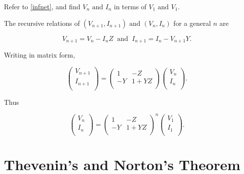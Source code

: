 \documentclass[english,a4paper,12pt]{report}
\begin{document}

{Refer to \cref{infnet}, and find \(V_{n} \text { and } I_{n}  \) in terms of \(V_1 \text { and } V_1 \).}
{The recursive relations of \((V_{n+1}, I_{n+1}) \text { and } (V_{n}, I_{n})\) for a general \(n\) are

\begin{equation}
    V_{n+1} = V_{n} - I_{n}Z ~\text { and }~ I_{n+1} = I_{n} - V_{n+1}Y.      
\end{equation}

Writing in matrix form,

\begin{equation}
    \begin{pmatrix}
         V_{n+1}  \\
         I_{n+1}  \\
    \end{pmatrix} = \begin{pmatrix}
        1 & -Z   \\
        -Y & 1+YZ  \\
    \end{pmatrix} \begin{pmatrix}
         V_{n}  \\
         I_{n}  \\
    \end{pmatrix}.
\end{equation}

Thus 

\begin{equation}
    \begin{pmatrix}
         V_{n}  \\
         I_{n}  \\
    \end{pmatrix} = \begin{pmatrix}
        1 & -Z  \\
        -Y & 1+YZ  \\
    \end{pmatrix}^{n} \begin{pmatrix}
        V_{1}  \\
        I_{1}  \\
   \end{pmatrix}.
\end{equation}



} 



\section{Thevenin's and Norton's Theorem}
\end{document}
